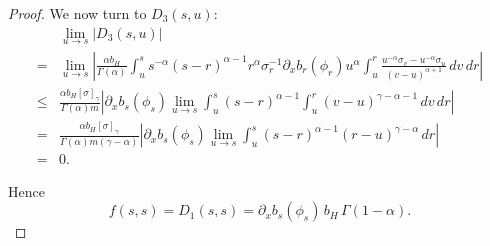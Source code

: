 \documentclass[preprint,12pt]{elsarticle}
\theoremstyle{definition}  %
\theoremstyle{plain}  %
\begin{document}
\begin{proof}
We now turn to $D_3(s,u)$:
\begin{align*}
	&\lim_{u\to s}|D_3(s,u)|\\
	=& \lim_{u\to s}\left|
	\frac{\alpha b_H}{\Gamma(\alpha)}
	\int_u^s s^{-\alpha}(s-r)^{\alpha-1}r^{\alpha}
	\sigma_r^{-1}\partial_x b_r(\phi_r)u^{\alpha}
	\int_u^r \frac{u^{-\alpha}\sigma_v - u^{-\alpha}\sigma_u}
	{(v-u)^{\alpha+1}}\,dv\,dr
	\right|\\
	\le & \frac{\alpha b_H[\sigma]_\gamma}{\Gamma(\alpha)m}
	\left|\partial_x b_s(\phi_s)
	\lim_{u\to s}\int_u^s (s-r)^{\alpha-1}
	\int_u^r (v-u)^{\gamma-\alpha-1}\,dv\,dr\right|\\
	=& \frac{\alpha b_H[\sigma]_\gamma}{\Gamma(\alpha)m(\gamma-\alpha)}
	\left|\partial_x b_s(\phi_s)
	\lim_{u\to s}\int_u^s (s-r)^{\alpha-1}(r-u)^{\gamma-\alpha}\,dr\right|\\
	=& 0.
\end{align*}

Hence
\[
	f(s,s) = D_1(s,s)
	= \partial_x b_s(\phi_s)\, b_H\,\Gamma(1-\alpha).
\]


\end{proof}
\end{document}
